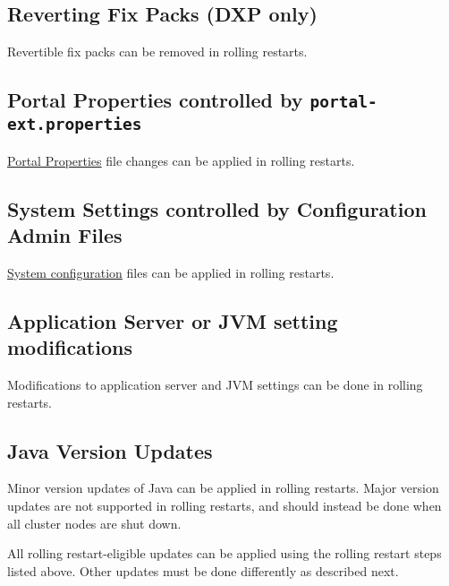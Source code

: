 \subsection{Reverting Fix Packs (DXP
only)}\label{reverting-fix-packs-dxp-only}

Revertible fix packs can be removed in rolling restarts.

\subsection{\texorpdfstring{Portal Properties controlled by
\texttt{portal-ext.properties}}{Portal Properties controlled by portal-ext.properties}}\label{portal-properties-controlled-by-portal-ext.properties}

\href{@platform-ref@/7.1-latest/propertiesdoc/portal.properties.html}{Portal
Properties} file changes can be applied in rolling restarts.

\subsection{System Settings controlled by Configuration Admin
Files}\label{system-settings-controlled-by-configuration-admin-files}

\href{/docs/7-0/user/-/knowledge_base/u/understanding-system-configuration-files}{System
configuration} files can be applied in rolling restarts.

\subsection{Application Server or JVM setting
modifications}\label{application-server-or-jvm-setting-modifications}

Modifications to application server and JVM settings can be done in
rolling restarts.

\subsection{Java Version Updates}\label{java-version-updates}

Minor version updates of Java can be applied in rolling restarts. Major
version updates are not supported in rolling restarts, and should
instead be done when all cluster nodes are shut down.

All rolling restart-eligible updates can be applied using the rolling
restart steps listed above. Other updates must be done differently as
described next.

